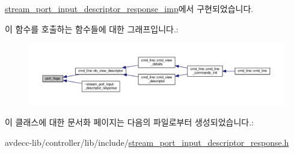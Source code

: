 \hyperlink{classavdecc__lib_1_1stream__port__input__descriptor__response__imp_ae5cbe71db539f040ce51a399c2ba66c5}{stream\+\_\+port\+\_\+input\+\_\+descriptor\+\_\+response\+\_\+imp}에서 구현되었습니다.



이 함수를 호출하는 함수들에 대한 그래프입니다.\+:
\nopagebreak
\begin{figure}[H]
\begin{center}
\leavevmode
\includegraphics[width=350pt]{classavdecc__lib_1_1stream__port__input__descriptor__response_a66bad2f1317cba04f0ea271f7181b58f_icgraph}
\end{center}
\end{figure}




이 클래스에 대한 문서화 페이지는 다음의 파일로부터 생성되었습니다.\+:\begin{DoxyCompactItemize}
\item 
avdecc-\/lib/controller/lib/include/\hyperlink{stream__port__input__descriptor__response_8h}{stream\+\_\+port\+\_\+input\+\_\+descriptor\+\_\+response.\+h}\end{DoxyCompactItemize}
